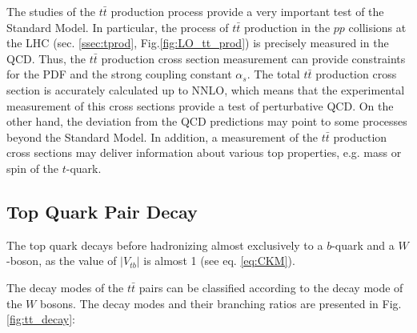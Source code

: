 The studies of the $t\bar{t}$ production process provide a very important test of the Standard Model. 
In particular, the process of $t\bar{t}$ production in the $pp$ collisions at the LHC (sec. \ref{ssec:tprod}, Fig.\ref{fig:LO_tt_prod})
is precisely measured in the QCD. Thus, the $t\bar{t}$ production cross section measurement can provide constraints for the PDF and the strong coupling constant $\alpha_s$.
The total $t\bar{t}$ production cross section is accurately calculated up to NNLO, which means that the experimental measurement of this cross sections provide a 
test of perturbative QCD.
On the other hand, the deviation from the QCD predictions may point to some processes beyond the Standard Model. In addition, a measurement of the $t\bar{t}$ production 
cross sections may deliver information about various top properties, e.g. mass or spin of the $t$-quark.

\subsection{Top Quark Pair Decay}\label{ssec:tdecay}

The top quark decays before hadronizing almost exclusively to a $b$-quark and a $W$-boson, as the value of $|V_{tb}|$ is almost 1 (see eq. \ref{eq:CKM}).

The decay modes of the $t\bar{t}$ pairs can be classified according to the decay mode of the $W$ bosons. The decay modes and their branching ratios are presented
in Fig. \ref{fig:tt_decay}:

